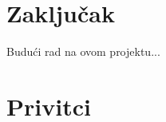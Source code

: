 \documentclass[seminarski, times, utf8]{fer}
\begin{document}
\chapter{Zaključak}
Budući rad na ovom projektu...
\label{pog:zakljucak}







\chapter{Privitci}
\end{document}
